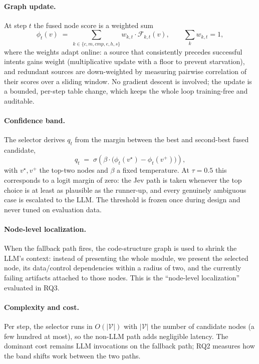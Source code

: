 \documentclass[11pt]{article}
\begin{document}
\paragraph{Graph update.}
At step $t$ the fused node score is a weighted sum
\begin{equation}
  \phi_t(v) \;=\; \sum_{k\in\{c,m,cmp,e,h,s\}} w_{k,t}\cdot \mathcal{F}_{k,t}(v), \qquad
  \sum_k w_{k,t}=1,
  \label{eq:fuse}
\end{equation}
where the weights adapt online: a source that consistently precedes successful intents gains weight (multiplicative update with a floor to prevent starvation), and redundant sources are down-weighted by measuring pairwise correlation of their scores over a sliding window. No gradient descent is involved; the update is a bounded, per-step table change, which keeps the whole loop training-free and auditable.

\paragraph{Confidence band.}
The selector derives $q_t$ from the margin between the best and second-best fused candidate,
\begin{equation}
  q_t \;=\; \sigma\!\left(\beta\cdot\big(\phi_t(v^\star)-\phi_t(v^{+})\big)\right),
  \label{eq:band}
\end{equation}
with $v^\star,v^{+}$ the top-two nodes and $\beta$ a fixed temperature. At $\tau=0.5$ this corresponds to a logit margin of zero: the Jev path is taken whenever the top choice is at least as plausible as the runner-up, and every genuinely ambiguous case is escalated to the LLM. The threshold is frozen once during design and never tuned on evaluation data.

\paragraph{Node-level localization.}
When the fallback path fires, the code-structure graph is used to shrink the LLM's context: instead of presenting the whole module, we present the selected node, its data/control dependencies within a radius of two, and the currently failing artifacts attached to those nodes. This is the ``node-level localization'' evaluated in RQ3.

\paragraph{Complexity and cost.}
Per step, the selector runs in $O(|\mathcal{V}|)$ with $|\mathcal{V}|$ the number of candidate nodes (a few hundred at most), so the non-LLM path adds negligible latency. The dominant cost remains LLM invocations on the fallback path; RQ2 measures how the band shifts work between the two paths.
\end{document}
